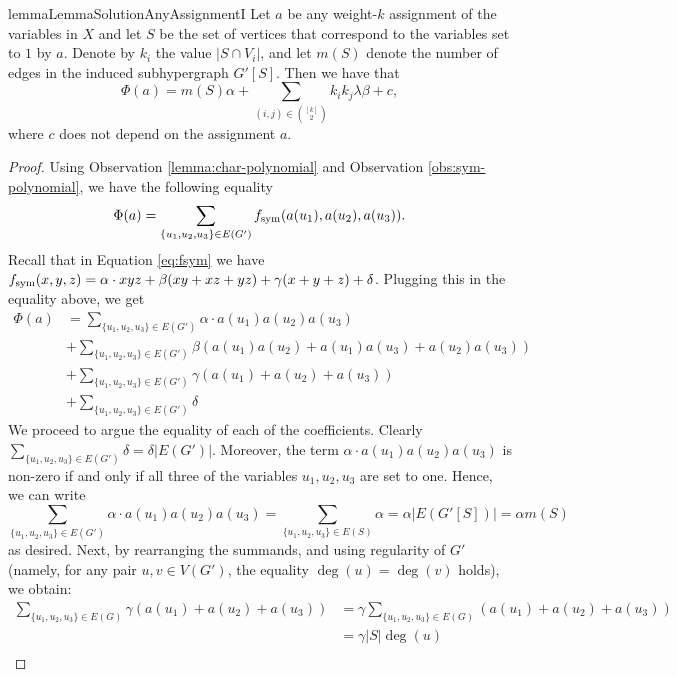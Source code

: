 \documentclass[a4paper,UKenglish,cleveref, autoref, thm-restate,numberwithinsect]{lipics-v2021}
\newcommand{\fsym}{f_{\rm sym}}
\begin{document}
\begin{restatable}{lemma}{LemmaSolutionAnyAssignmentI}\label{lemma:solution-any-assignment}
    Let $a$ be any weight-$k$ assignment of the variables in $X$ and let $S$ be the set of vertices that correspond to the variables set to $1$ by $a$.
    Denote by $k_i$ the value $|S\cap V_i|$, and let $m(S)$ denote the number of edges in the induced subhypergraph $G'[S]$.
    Then we have that 
    \[
    \Phi(a) = m(S)\alpha + \sum_{(i,j)\in \binom{[k]}{2}} k_ik_j \lambda \beta + c,
    \]
    where $c$ does not depend on the assignment $a$.
\end{restatable}
\begin{proof}
    Using Observation \ref{lemma:char-polynomial} and Observation \ref{obs:sym-polynomial}, we have the following equality
    \[
        \Phi(a) = \sum_{\{u_1,u_2,u_3\}\in E(G')} \fsym(a(u_1),a(u_2),a(u_3)).
    \]
    Recall that in Equation \ref{eq:fsym} we have $\fsym(x,y,z) = \alpha \cdot xyz + \beta (xy+xz+yz) + \gamma(x+y+z) + \delta$. Plugging this in the equality above, we get
    \begin{align*}
        \Phi(a) &= \sum_{\{u_1,u_2,u_3\}\in E(G')} \alpha \cdot a(u_1)a(u_2)a(u_3) 
                    \\ &+ \sum_{\{u_1,u_2,u_3\}\in E(G')}\beta \left(a(u_1)a(u_2)+a(u_1)a(u_3)+a(u_2)a(u_3)\right) 
                    \\ & + \sum_{\{u_1,u_2,u_3\}\in E(G')}  \gamma\left(a(u_1)+a(u_2)+a(u_3)\right) 
                    \\ & + \sum_{\{u_1,u_2,u_3\}\in E(G')} \delta
    \end{align*}
    We proceed to argue the equality of each of the coefficients. 
    Clearly $\sum_{\{u_1,u_2,u_3\}\in E(G')} \delta = \delta |E(G')|$. 
    Moreover, the term $\alpha \cdot a(u_1)a(u_2)a(u_3)$ is non-zero if and only if all three of the variables $u_1,u_2,u_3$ are set to one. Hence, we can write 
    \[
    \sum_{\{u_1,u_2,u_3\}\in E(G')} \alpha \cdot a(u_1)a(u_2)a(u_3) = \sum_{\{u_1,u_2,u_3\}\in E(S)} \alpha = \alpha |E(G'[S])| = \alpha m(S)
    \]
    as desired. 
    Next, by rearranging the summands, and using regularity of $G'$ (namely, for any pair $u,v\in V(G')$, the equality $\deg(u)= \deg(v)$ holds), we obtain:
    \begin{align*}
        \sum_{\{u_1,u_2,u_3\}\in E(G)}  \gamma\left(a(u_1)+a(u_2)+a(u_3)\right)  &= \gamma\sum_{\{u_1,u_2,u_3\}\in E(G)}  \left(a(u_1)+a(u_2)+a(u_3)\right)  \\
        &= \gamma|S|\deg(u) \tag{\textasteriskcentered}\\

\end{align*}
\end{proof}
\end{document}

